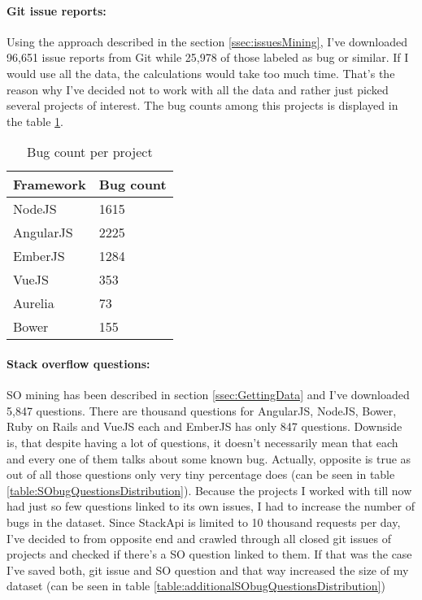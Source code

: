 \paragraph{Git issue reports:}
Using the approach described in the section \ref{ssec:issuesMining}, I've downloaded 96,651 issue reports from Git while 25,978 of those labeled as bug or similar. If I would use all the data, the calculations would take too much time. That's the reason why I've decided not to work with all the data and rather just picked several projects of interest. The bug counts among this projects is displayed in the table \ref{table:gitProjectIssuesDistribution}.


\begin{table}[H]
\centering
\begin{tabular}{ |p{3cm}||p{3cm}|}
 \hline
\textbf{ Framework }& \textbf{Bug count}\\
 \hline
 NodeJS   & 1615\\ \hline
 AngularJS &   2225 \\ \hline
 EmberJS & 1284\\ \hline
 VueJS & 353\\ \hline
 Aurelia & 73\\ \hline
 Bower & 155\\ \hline
\end{tabular}
\caption{Bug count per project}
\label{table:gitProjectIssuesDistribution}
\end{table}

\paragraph{Stack overflow questions:}
SO mining has been described in section \ref{ssec:GettingData} and I've downloaded 5,847 questions. There are thousand questions for AngularJS, NodeJS, Bower, Ruby on Rails and VueJS each and EmberJS has only 847 questions. Downside is, that despite having a lot of questions, it doesn't necessarily mean that each and every one of them talks about some known bug. Actually, opposite is true as out of all those questions only very tiny percentage does (can be seen in table \ref{table:SObugQuestionsDistribution}). Because the projects I worked with till now had just so few questions linked to its own issues, I had to increase the number of bugs in the dataset. Since StackApi is limited to 10 thousand requests per day, I've decided to from opposite end and crawled through all closed git issues of projects and checked if there's a SO question linked to them. If that was the case I've saved both, git issue and SO question and that way increased the size of my dataset (can be seen in table \ref{table:additionalSObugQuestionsDistribution})

